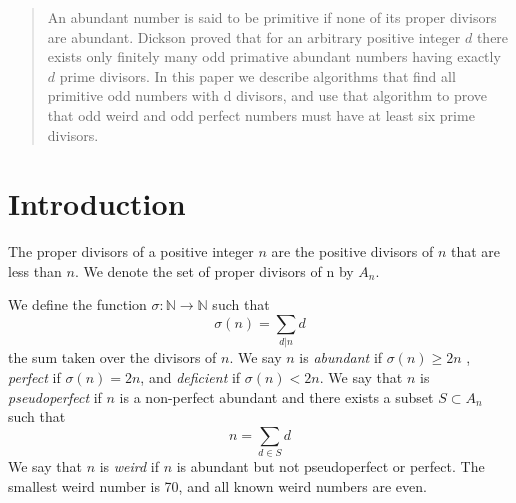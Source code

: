 \documentclass[../paper.tex]{article}
\begin{document}
\begin{abstract}
An abundant number is said to be primitive if none of its proper 
divisors are abundant.  Dickson proved that for an arbitrary
positive integer $d$ there exists only finitely many odd primative
abundant numbers having exactly $d$ prime divisors.
In this paper we describe algorithms
that find all primitive odd numbers with d divisors, and use that
algorithm to prove that odd weird and odd perfect numbers must
have at least six prime divisors.

\end{abstract}

\section{Introduction}
The proper divisors of a positive integer $n$ are the positive
divisors of $n$ that are less than $n$. We denote the set of 
proper divisors of n by $\textit{A}_{n}$.

We define the function 
%
$\sigma: \mathbb{N} \rightarrow \mathbb{N}$
%
such that
%
$$\sigma(n) = \sum_{d|n}d$$
%
the sum taken over the divisors of $n$. We say $n$ is 
\textit{abundant} if $\sigma(n) \geq 2n$ \footnotemark
, \textit{perfect} if $\sigma(n) = 2n$, and \textit{deficient} if 
$\sigma(n) < 2n$. We say that $n$ is \textit{pseudoperfect} if 
$n$ is a non-perfect abundant and there exists a subset $ S 
\subset \textit{A}_{n}$ such that
%
$$ n = \sum_{d \in S} d$$
%
We say that $n$ is \textit{weird} if $n$ is abundant but not 
pseudoperfect or perfect. The smallest weird number is 70, and 
all known weird numbers are even.
\end{document}

